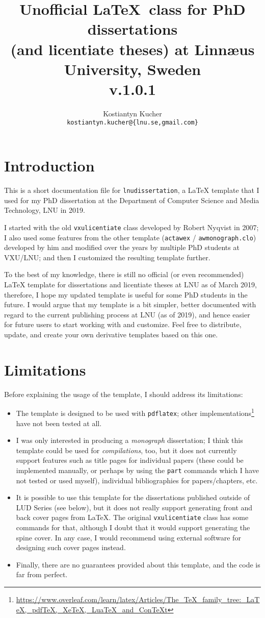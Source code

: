 \documentclass[10pt,a4paper]{article}
\title{Unofficial \LaTeX\ class for PhD dissertations\\(and licentiate theses) at Linn{\ae}us University, Sweden\\v.1.0.1}
\author{Kostiantyn Kucher\\
\texttt{kostiantyn.kucher@\{lnu.se,gmail.com\}}
}
\begin{document}
\maketitle

\section{Introduction}
This is a short documentation file for \texttt{lnudissertation}, a LaTeX template that I used for my PhD dissertation at the Department of Computer Science and Media Technology, LNU in 2019. 

I started with the old \texttt{vxulicentiate} class developed by Robert Nyqvist in 2007; I also used some features from the other template (\texttt{actawex} / \texttt{awmonograph.clo}) developed by him and modified over the years by multiple PhD students at VXU/LNU; and then I customized the resulting template further. 

To the best of my knowledge, there is still no official (or even recommended) LaTeX template for dissertations and licentiate theses at LNU as of March 2019, therefore, I hope my updated template is useful for some PhD students in the future. 
I would argue that my template is a bit simpler, better documented with regard to the current publishing process at LNU (as of 2019), and hence easier for future users to start working with and customize. 
Feel free to distribute, update, and create your own derivative templates based on this one.

\section{Limitations}
Before explaining the usage of the template, I should address its limitations:
\begin{itemize}
\item The template is designed to be used with \texttt{pdflatex}; other implementations\footnote{\url{https://www.overleaf.com/learn/latex/Articles/The_TeX_family_tree:_LaTeX,_pdfTeX,_XeTeX,_LuaTeX_and_ConTeXt}} have not been tested at all. 
\item I was only interested in producing a \emph{monograph} dissertation; I think this template could be used for \emph{compilations}, too, but it does not currently support features such as title pages for individual papers (these could be implemented manually, or perhaps by using the \texttt{part} commands which I have not tested or used myself), individual bibliographies for papers/chapters, etc. 
\item It is possible to use this template for the dissertations published outside of LUD Series (see below), but it does not really support generating front and back cover pages from LaTeX. The original \texttt{vxulicentiate} class has some commands for that, although I doubt that it would support generating the spine cover. In any case, I would recommend using external software for designing such cover pages instead.
\item Finally, there are no guarantees provided about this template, and the code is far from perfect.  
\end{itemize}
\end{document}
